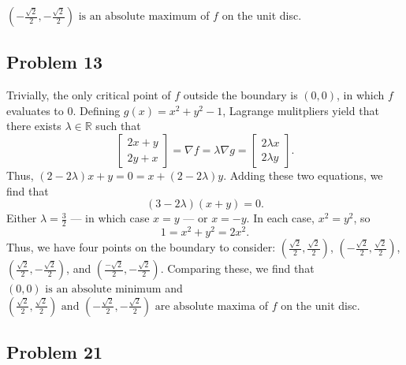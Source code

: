 \documentclass[11pt]{article}
\renewcommand{\grad}{\nabla}
\begin{document}
$\boxed{\text{$\left( -\tfrac{\sqrt{2}}{2}, -\tfrac{\sqrt{2}}{2} \right)$ is an absolute maximum}}$ of $f$ on the unit disc.


\subsection*{Problem 13}

Trivially, the only critical point of $f$ outside the boundary is $(0, 0)$, in which $f$ evaluates to $0$. Defining $g(x) = x^{2} + y^{2} - 1$, Lagrange mulitpliers yield that there exists $\lambda \in \mathbb{R}$ such that
\[
	\begin{bmatrix} 2x + y \\ 2y + x \end{bmatrix} = \grad f = \lambda \grad g = \begin{bmatrix} 2\lambda x \\ 2\lambda y \end{bmatrix}.
\]
Thus, $(2 - 2\lambda)x + y = 0 = x + (2 - 2\lambda)y$. Adding these two equations, we find that
\[
	(3 - 2\lambda)(x + y) = 0.
\]
Either $\lambda = \tfrac{3}{2}$ --- in which case $x = y$ --- or $x = -y$. In each case, $x^{2} = y^{2}$, so
\[
	1 = x^{2} + y^{2} = 2x^{2}.
\]
Thus, we have four points on the boundary to consider: $\left( \tfrac{\sqrt{2}}{2}, \tfrac{\sqrt{2}}{2} \right)$, $\left( -\tfrac{\sqrt{2}}{2}, \tfrac{\sqrt{2}}{2} \right)$, $\left( \tfrac{\sqrt{2}}{2}, -\tfrac{\sqrt{2}}{2} \right)$, and $\left( \tfrac{-\sqrt{2}}{2}, -\tfrac{\sqrt{2}}{2} \right)$. Comparing these, we find that $\boxed{\text{$(0, 0)$ is an absolute minimum}}$ and $\boxed{\text{$\left( \tfrac{\sqrt{2}}{2}, \tfrac{\sqrt{2}}{2} \right)$ and $\left( -\tfrac{\sqrt{2}}{2}, -\tfrac{\sqrt{2}}{2} \right)$ are absolute maxima}}$ of $f$ on the unit disc.


\subsection*{Problem 21}
\end{document}
